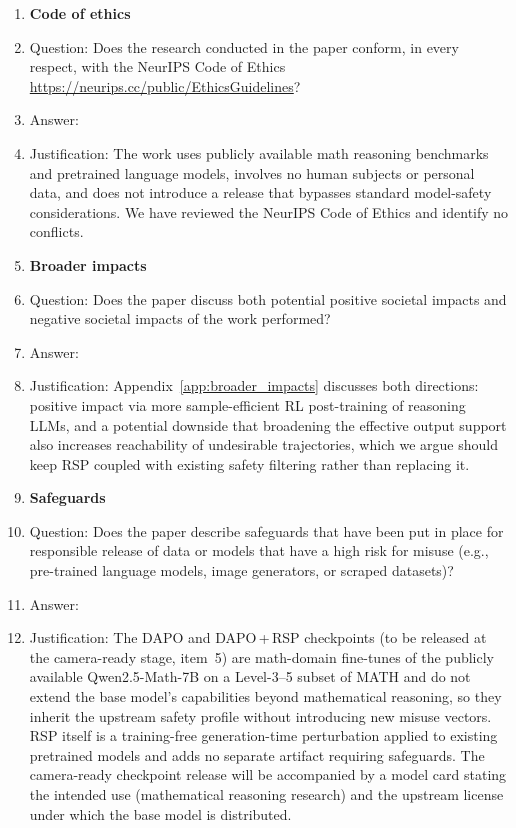 \begin{enumerate}
\item {\bf Code of ethics}
    \item[] Question: Does the research conducted in the paper conform, in every respect, with the NeurIPS Code of Ethics \url{https://neurips.cc/public/EthicsGuidelines}?
    \item[] Answer: \answerYes{}
    \item[] Justification: The work uses publicly available math reasoning benchmarks and pretrained language models, involves no human subjects or personal data, and does not introduce a release that bypasses standard model-safety considerations. We have reviewed the NeurIPS Code of Ethics and identify no conflicts.

\item {\bf Broader impacts}
    \item[] Question: Does the paper discuss both potential positive societal impacts and negative societal impacts of the work performed?
    \item[] Answer: \answerYes{}
    \item[] Justification: Appendix~\ref{app:broader_impacts} discusses both directions: positive impact via more sample-efficient RL post-training of reasoning LLMs, and a potential downside that broadening the effective output support also increases reachability of undesirable trajectories, which we argue should keep RSP coupled with existing safety filtering rather than replacing it.

\item {\bf Safeguards}
    \item[] Question: Does the paper describe safeguards that have been put in place for responsible release of data or models that have a high risk for misuse (e.g., pre-trained language models, image generators, or scraped datasets)?
    \item[] Answer: \answerNA{}
    \item[] Justification: The DAPO and DAPO\,+\,RSP checkpoints (to be released at the camera-ready stage, item~5) are math-domain fine-tunes of the publicly available Qwen2.5-Math-7B \citep{yang2024qwen25math} on a Level-3--5 subset of MATH and do not extend the base model's capabilities beyond mathematical reasoning, so they inherit the upstream safety profile without introducing new misuse vectors. RSP itself is a training-free generation-time perturbation applied to existing pretrained models and adds no separate artifact requiring safeguards. The camera-ready checkpoint release will be accompanied by a model card stating the intended use (mathematical reasoning research) and the upstream license under which the base model is distributed.


\end{enumerate}
